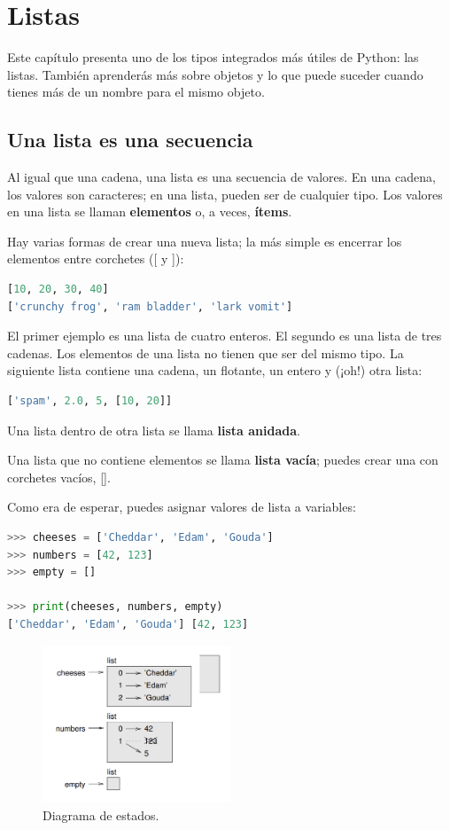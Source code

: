 \chapter{Listas}

Este capítulo presenta uno de los tipos integrados más útiles de Python: las listas. También aprenderás más sobre objetos y lo que puede suceder cuando tienes más de un nombre para el mismo objeto.

\section{Una lista es una secuencia}

Al igual que una cadena, una lista es una secuencia de valores. En una cadena, los valores son caracteres; en una lista, pueden ser de cualquier tipo. Los valores en una lista se llaman \textbf{elementos} o, a veces, \textbf{ítems}.

Hay varias formas de crear una nueva lista; la más simple es encerrar los elementos entre corchetes ([ y ]):

\begin{lstlisting}[language=Python]
[10, 20, 30, 40]  
['crunchy frog', 'ram bladder', 'lark vomit']  
\end{lstlisting}

El primer ejemplo es una lista de cuatro enteros. El segundo es una lista de tres cadenas. Los elementos de una lista no tienen que ser del mismo tipo. La siguiente lista contiene una cadena, un flotante, un entero y (¡oh!) otra lista:

\begin{lstlisting}[language=Python]
['spam', 2.0, 5, [10, 20]]
\end{lstlisting}

Una lista dentro de otra lista se llama \textbf{lista anidada}.

Una lista que no contiene elementos se llama \textbf{lista vacía}; puedes crear una con corchetes vacíos, [].

Como era de esperar, puedes asignar valores de lista a variables:

\begin{lstlisting}[language=Python]
>>> cheeses = ['Cheddar', 'Edam', 'Gouda']  
>>> numbers = [42, 123]  
>>> empty = []  

>>> print(cheeses, numbers, empty)  
['Cheddar', 'Edam', 'Gouda'] [42, 123]
\end{lstlisting}
\begin{figure}[h]
        \centering
        \includegraphics[width=0.5\textwidth]{./images/chapter_10_1.png}
        \caption{Diagrama de estados.}
        \label{fig:10_1}
        \end{figure}

